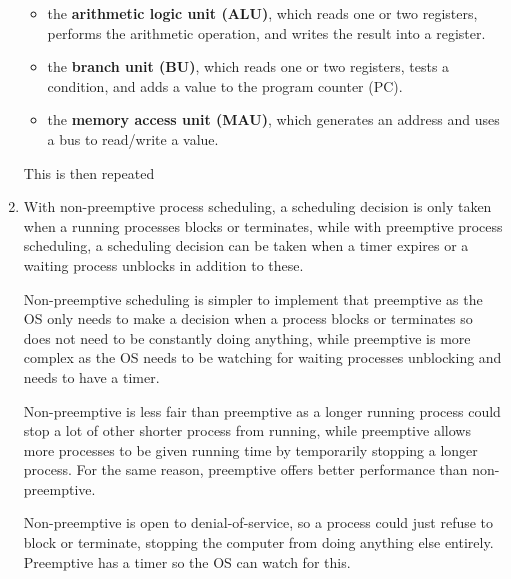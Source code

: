 \documentclass[12pt]{article}
\begin{document}
\begin{enumerate}
\begin{itemize}
            \item the \textbf{arithmetic logic unit (ALU)}, which reads one or two registers, performs the arithmetic operation, and writes the result into a register.
            \item the \textbf{branch unit (BU)}, which reads one or two registers, tests a condition, and adds a value to the program counter (PC).
            \item the \textbf{memory access unit (MAU)}, which generates an address and uses a bus to read/write a value.
      \end{itemize}
      This is then repeated
      \item With non-preemptive process scheduling, a scheduling decision is only taken when a running processes blocks or terminates, while with preemptive process scheduling, a scheduling decision can be taken when a timer expires or a waiting process unblocks in addition to these.

            Non-preemptive scheduling is simpler to implement that preemptive as the OS only needs to make a decision when a process blocks or terminates so does not need to be constantly doing anything, while preemptive is more complex as the OS needs to be watching for waiting processes unblocking and needs to have a timer.

            Non-preemptive is less fair than preemptive as a longer running process could stop a lot of other shorter process from running, while preemptive allows more processes to be given running time by temporarily stopping a longer process. For the same reason, preemptive offers better performance than non-preemptive.

            Non-preemptive is open to denial-of-service, so a process could just refuse to block or terminate, stopping the computer from doing anything else entirely. Preemptive has a timer so the OS can watch for this.


\end{enumerate}
\end{document}
